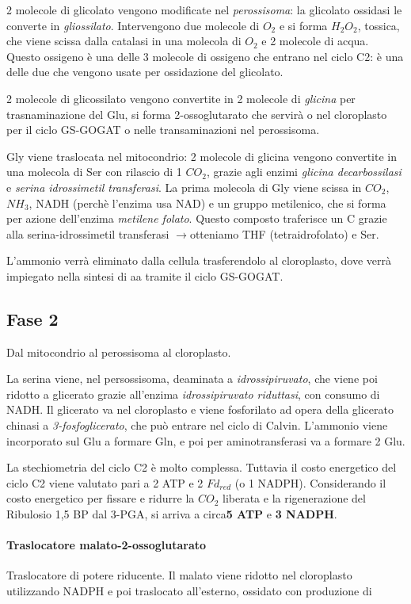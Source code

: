 \documentclass[a4paper,12pt]{book}
\newcommand{\lfreccia}{\ensuremath{\longrightarrow}}
\begin{document}
2 molecole di glicolato vengono modificate nel \emph{perossisoma}: la glicolato ossidasi le converte in \emph{gliossilato}. Intervengono due molecole di  $O_{2}$ e si forma $H_{2}O_{2}$, tossica, che viene scissa dalla catalasi in una molecola di $O_{2}$ e 2 molecole di acqua. Questo ossigeno è una delle 3 molecole di ossigeno che entrano nel ciclo C2: è una delle due che vengono usate per ossidazione del glicolato.

2 molecole di glicossilato vengono convertite in 2 molecole di \emph{glicina} per trasnaminazione del Glu, si forma 2-ossoglutarato che servirà o nel cloroplasto per il ciclo GS-GOGAT o nelle transaminazioni nel perossisoma.

Gly viene traslocata nel mitocondrio: 2 molecole di glicina vengono convertite in una molecola di Ser con rilascio di 1 $CO_{2}$, grazie agli enzimi \emph{glicina decarbossilasi} e \emph{serina idrossimetil transferasi}.
La prima molecola di Gly viene scissa in $CO_{2}$, $NH_{3}$, NADH (perchè l'enzima usa NAD) e un gruppo metilenico, che si forma per azione dell'enzima \emph{metilene folato}. Questo composto traferisce un C grazie alla serina-idrossimetil transferasi \lfreccia otteniamo THF (tetraidrofolato) e Ser.  

L'ammonio verrà eliminato dalla cellula trasferendolo al cloroplasto, dove verrà impiegato nella sintesi di aa tramite il ciclo GS-GOGAT.

\subsection{Fase 2}
Dal mitocondrio al perossisoma al cloroplasto.

La serina viene, nel persossisoma, deaminata a \emph{idrossipiruvato}, che viene poi ridotto a glicerato grazie all'enzima \emph{idrossipiruvato riduttasi}, con consumo di NADH.
 Il glicerato va nel cloroplasto e viene fosforilato ad opera della glicerato chinasi a \emph{3-fosfoglicerato}, che può entrare nel ciclo di Calvin. L'ammonio viene incorporato sul Glu a formare Gln, e poi per aminotransferasi va a formare 2 Glu.
 
La stechiometria del ciclo C2 è molto complessa. Tuttavia il costo energetico del ciclo C2
viene valutato pari a 2 ATP e 2 $Fd_{red}$ (o 1 NADPH).
Considerando il costo energetico per fissare e ridurre la $CO_{2}$ liberata e la rigenerazione del
Ribulosio 1,5 BP dal 3-PGA, si arriva a circa\textbf{5 ATP} e \textbf{3 NADPH}. 
 
\paragraph{Traslocatore malato-2-ossoglutarato}
Traslocatore di potere riducente. Il malato viene ridotto nel cloroplasto utilizzando NADPH e poi traslocato all'esterno, ossidato con produzione di
\end{document}
